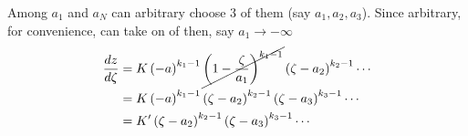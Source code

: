 \begin{note}
\begin{enumerate}[label = \protect\circled{\arabic*}]
\begin{conclusion}
Among $a_1$ and $a_N$ can arbitrary choose 3 of them (say $a_1,a_2,a_3$). Since arbitrary, for convenience, can take on of then, say $\boxed{a_1}\to -\infty$
\begin{align*}
\frac{dz}{d\zeta}
&= K\left(-a\right)^{k_1-1}\cancel{\left(1-\frac{\zeta}{a_1}\right)^{k_1-1}}\left(\zeta-a_2\right)^{k_2-1}\cdots \\
&= K\left(-a\right)^{k_1-1}\left(\zeta-a_2\right)^{k_2-1}\left(\zeta-a_3\right)^{k_3-1}\cdots \\
&= K'\left(\zeta-a_2\right)^{k_2-1}\left(\zeta-a_3\right)^{k_3-1}\cdots
\end{align*}
\end{conclusion}
\end{enumerate}
\end{note}